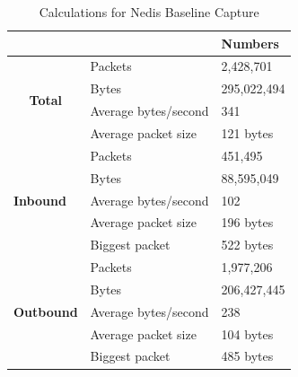 \begin{table}[H]
    \caption{Calculations for Nedis Baseline Capture}
    \centering
    \begin{tabular}{ll|l|}
        \cline{3-3}                                               &                               &             \textbf{Numbers} \\ \hline
        \multicolumn{1}{|c|}{\multirow{4}{*}{\textbf{Total}}}    & Packets              & 2,428,701         \\ \cline{2-3} 
        \multicolumn{1}{|c|}{}                                   & Bytes                & 295,022,494       \\ \cline{2-3} 
        \multicolumn{1}{|c|}{}                                   & Average bytes/second & 341               \\ \cline{2-3} 
        \multicolumn{1}{|c|}{}                                   & Average packet size  & 121 bytes        \\ \hline
        \multicolumn{1}{|l|}{\multirow{5}{*}{\textbf{Inbound}}}  & Packets              & 451,495           \\ \cline{2-3} 
        \multicolumn{1}{|l|}{}                                   & Bytes                & 88,595,049        \\ \cline{2-3} 
        \multicolumn{1}{|l|}{}                                   & Average bytes/second & 102                \\ \cline{2-3} 
        \multicolumn{1}{|l|}{}                                   & Average packet size  & 196 bytes         \\ \cline{2-3} 
        \multicolumn{1}{|l|}{}                                   & Biggest packet       & 522 bytes        \\ \hline
        \multicolumn{1}{|l|}{\multirow{5}{*}{\textbf{Outbound}}} & Packets              & 1,977,206         \\ \cline{2-3} 
        \multicolumn{1}{|l|}{}                                   & Bytes                & 206,427,445      \\ \cline{2-3} 
        \multicolumn{1}{|l|}{}                                   & Average bytes/second & 238               \\ \cline{2-3} 
        \multicolumn{1}{|l|}{}                                   & Average packet size  & 104 bytes         \\ \cline{2-3} 
        \multicolumn{1}{|l|}{}                                   & Biggest packet       & 485 bytes       \\ \hline
    \end{tabular}
    \label{tab:NedisBaselineCalculations}
\end{table} 


